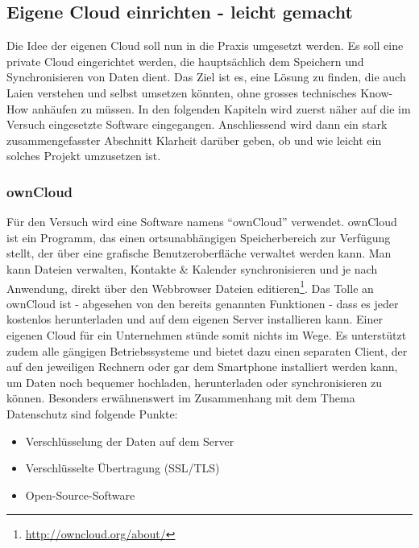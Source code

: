 \subsection{Eigene Cloud einrichten - leicht gemacht}
Die Idee der eigenen Cloud soll nun in die Praxis umgesetzt werden. Es soll eine private Cloud eingerichtet werden, die hauptsächlich dem Speichern und Synchronisieren von Daten dient. Das Ziel ist es, eine Lösung zu finden, die auch Laien verstehen und selbst umsetzen könnten, ohne grosses technisches Know-How anhäufen zu müssen. In den folgenden Kapiteln wird zuerst näher auf die im Versuch eingesetzte Software eingegangen. Anschliessend wird dann ein stark zusammengefasster Abschnitt Klarheit darüber geben, ob und wie leicht ein solches Projekt umzusetzen ist.

\subsubsection{ownCloud}
Für den Versuch wird eine Software namens ``ownCloud'' verwendet. ownCloud ist ein Programm, das einen ortsunabhängigen Speicherbereich zur Verfügung stellt, der über eine grafische Benutzeroberfläche verwaltet werden kann. Man kann Dateien verwalten, Kontakte \& Kalender synchronisieren und je nach Anwendung, direkt über den Webbrowser Dateien editieren\footnote{\url{http://owncloud.org/about/}}.
Das Tolle an ownCloud ist - abgesehen von den bereits genannten Funktionen - dass es jeder kostenlos herunterladen und auf dem eigenen Server installieren kann. Einer eigenen Cloud für ein Unternehmen stünde somit nichts im Wege. Es unterstützt zudem alle gängigen Betriebssysteme und bietet dazu einen separaten Client, der auf den jeweiligen Rechnern oder gar dem Smartphone installiert werden kann, um Daten noch bequemer hochladen, herunterladen oder synchronisieren zu können.
Besonders erwähnenswert im Zusammenhang mit dem Thema Datenschutz sind folgende Punkte:

\begin{itemize}
\item Verschlüsselung der Daten auf dem Server
\item Verschlüsselte Übertragung (SSL/TLS)
\item Open-Source-Software
\end{itemize}

